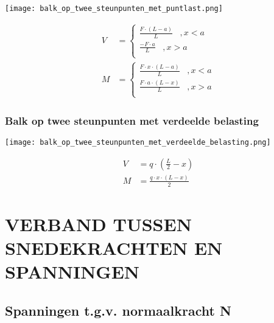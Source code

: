                 \begin{center}
                    \texttt{[image: balk\_op\_twee\_steunpunten\_met\_puntlast.png]}
                \end{center}
                
                \begin{align}
                    V &= \left\lbrace\begin{matrix}
                        \frac{F\cdot\left(L-a\right)}{L}\;\;\; , x < a\\
                        \frac{-F\cdot a}{L}\;\;\; , x > a\\
                    \end{matrix}\right.\nonumber\\
                    M &= \left\lbrace\begin{matrix}
                        \frac{F\cdot x\cdot\left(L-a\right)}{L}\;\;\; , x < a\\
                        \frac{F\cdot a\cdot\left(L-x\right)}{L}\;\;\; , x > a\\
                    \end{matrix}\right.\nonumber
                \end{align}

            \subsubsection{Balk op twee steunpunten met verdeelde belasting}

                \begin{center}
                    \texttt{[image: balk\_op\_twee\_steunpunten\_met\_verdeelde\_belasting.png]}
                \end{center}

                \begin{align}
                    V &= q\cdot\left(\frac{L}{2}-x\right)\nonumber\\
                    M &= \frac{q\cdot x \cdot \left(L-x\right)}{2}\nonumber
                \end{align}
        
    \section{VERBAND TUSSEN SNEDEKRACHTEN EN SPANNINGEN}

        \subsection{Spanningen t.g.v. normaalkracht N}

